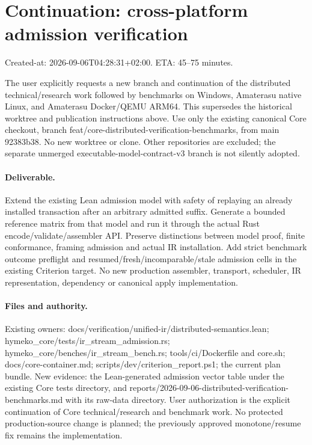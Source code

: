 \documentclass[11pt,a4paper]{article}
\begin{document}
\section*{Continuation: cross-platform admission verification}
Created-at: 2026-09-06T04:28:31+02:00. ETA: 45--75 minutes.

The user explicitly requests a new branch and continuation of the distributed
technical/research work followed by benchmarks on Windows, Amaterasu native Linux,
and Amaterasu Docker/QEMU ARM64. This supersedes the historical worktree and
publication instructions above. Use only the existing canonical Core checkout,
branch feat/core-distributed-verification-benchmarks, from main 92383b38. No new
worktree or clone. Other repositories are excluded; the separate unmerged
executable-model-contract-v3 branch is not silently adopted.

\paragraph{Deliverable.}
Extend the existing Lean admission model with safety of replaying an already
installed transaction after an arbitrary admitted suffix. Generate a bounded
reference matrix from that model and run it through the actual Rust
encode/validate/assembler API. Preserve distinctions between model proof,
finite conformance, framing admission and actual IR installation. Add strict
benchmark outcome preflight and resumed/fresh/incomparable/stale admission cells
in the existing Criterion target. No new production assembler, transport,
scheduler, IR representation, dependency or canonical apply implementation.

\paragraph{Files and authority.}
Existing owners: docs/verification/unified-ir/distributed-semantics.lean;
hymeko\_core/tests/ir\_stream\_admission.rs;
hymeko\_core/benches/ir\_stream\_bench.rs; tools/ci/Dockerfile and core.sh;
docs/core-container.md; scripts/dev/criterion\_report.ps1; the current plan bundle.
New evidence: the Lean-generated admission vector table under the existing Core
tests directory, and reports/2026-09-06-distributed-verification-benchmarks.md with
its raw-data directory. User authorization is the explicit continuation of Core
technical/research and benchmark work. No protected production-source change is
planned; the previously approved monotone/resume fix remains the implementation.
\end{document}
